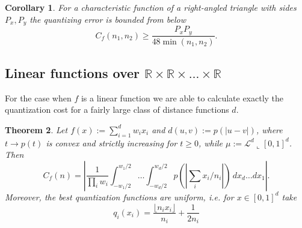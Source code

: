 \documentclass{amsart}
\newtheorem{theorem}{Theorem}[section]
\newtheorem{corollary}[theorem]{Corollary}
\theoremstyle{remark}
\numberwithin{equation}{section}
\numberwithin{figure}{section}
\newcommand{\R}{\mathbb{R}}
\newcommand{\res}{\llcorner}
\begin{document}
\begin{corollary}
	For a characteristic function of a right-angled triangle with sides $P_x, P_y$ the quantizing error is bounded from below
	\[
	C_f(n_1, n_2) \geq \frac{P_x P_y}{48 \min(n_1, n_2)}.
	\]
\end{corollary}
	

	\subsection{Linear functions over $\R\times \R \times \ldots \times \R$}
	
	For the case when $f$ is a linear function we are able to calculate exactly the quantization cost for a fairly large class of distance functions $d$.
	
\begin{theorem}
	\label{th_quantLinear1}
	Let $f(x) := \sum_{i=1}^d w_i x_i$ and $d(u, v) := p(|u-v|)$, where $t \to p(t)$ is convex and strictly increasing for $t\geq 0$, while $\mu:=\mathcal{L}^d\res [0,1]^d$. Then
	\[
	C_f(n) =  \left|\frac{1}{\prod_i w_i} \int_{-w_1/2}^{w_1/2}\ldots \int_{-w_d/2}^{w_d/2} p\left(\left|\sum_{i} x_i/n_i\right|\right)\, dx_d \ldots dx_1\right|.
	\]
	Moreover, the best quantization functions are uniform, i.e. for $x \in [0, 1]^d$ take
	\[
	q_i(x_i) = \frac{\lfloor n_ix_i \rfloor}{n_i} + \frac{1}{2n_i}
	\]
\end{theorem}
\end{document}
